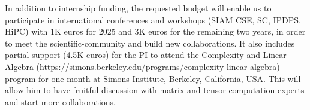 \documentclass[a4paper,11pt]{article}
\newcommand{\sk}[1]{{\color{blue} \emph{#1}}}
\begin{document}
   	
   	In addition to internship funding, the requested budget will enable us to participate in international conferences and workshops (SIAM CSE, SC, IPDPS, HiPC) with 1K euros for 2025 and 3K euros for the remaining two years, in order to meet the scientific-community and build new collaborations. It also includes partial support (4.5K euros) for the PI to attend the Complexity and Linear Algebra (\url{https://simons.berkeley.edu/programs/complexity-linear-algebra}) program for one-month at Simons Institute, Berkeley, California, USA. This will allow him to have fruitful discussion with matrix and tensor computation experts and start more collaborations.


	
	
	
	\vspace*{-0.215cm}
	{\footnotesize
		
		
	}
\vspace*{-0.215cm}
	

%	
\end{document}
